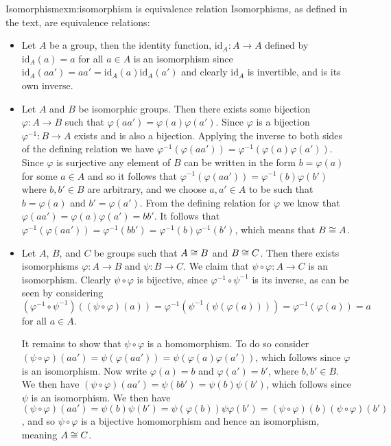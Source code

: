 \begin{exm}{Isomorphism}{exm:isomorphism is equivalence relation}
    Isomorphisms, as defined in the text, are equivalence relations:
    \begin{itemize}
        \item Let \(A\) be a group, then the identity function, \(\mathrm{id}_A\colon A \to A\) defined by \(\mathrm{id}_A(a) = a\) for all \(a \in A\) is an isomorphism since \(\mathrm{id}_A(aa') = aa' = \mathrm{id}_A(a)\mathrm{id}_A(a')\) and clearly \(\mathrm{id}_A\) is invertible, and is its own inverse.
        \item Let \(A\) and \(B\) be isomorphic groups.
        Then there exists some bijection \(\varphi \colon A \to B\) such that \(\varphi(aa') = \varphi(a)\varphi(a')\).
        Since \(\varphi\) is a bijection \(\varphi^{-1}\colon B \to A\) exists and is also a bijection.
        Applying the inverse to both sides of the defining relation we have \(\varphi^{-1}(\varphi(aa')) = \varphi^{-1}(\varphi(a)\varphi(a'))\).
        Since \(\varphi\) is surjective any element of \(B\) can be written in the form \(b = \varphi(a)\) for some \(a \in A\) and so it follows that \(\varphi^{-1}(\varphi(aa')) = \varphi^{-1}(b)\varphi(b')\) where \(b, b' \in B\) are arbitrary, and we choose \(a, a' \in A\) to be such that \(b = \varphi(a)\) and \(b' = \varphi(a')\).
        From the defining relation for \(\varphi\) we know that \(\varphi(aa') = \varphi(a)\varphi(a') = bb'\).
        It follows that \(\varphi^{-1}(\varphi(aa')) = \varphi^{-1}(bb') = \varphi^{-1}(b)\varphi^{-1}(b')\), which means that \(B \cong A\).
        \item Let \(A\), \(B\), and \(C\) be groups such that \(A \cong B\) and \(B \cong C\).
        Then there exists isomorphisms \(\varphi \colon A \to B\) and \(\psi\colon B \to C\).
        We claim that \(\psi\circ \varphi \colon A \to C\) is an isomorphism.
        Clearly \(\psi\circ \varphi\) is bijective, since \(\varphi^{-1}\circ \psi^{-1}\) is its inverse, as can be seen by considering \((\varphi^{-1}\circ \psi^{-1})((\psi\circ \varphi)(a)) = \varphi^{-1}(\psi^{-1}(\psi(\varphi(a)))) = \varphi^{-1}(\varphi(a)) = a\) for all \(a \in A\).
        
        It remains to show that \(\psi \circ \varphi\) is a homomorphism.
        To do so consider \((\psi \circ \varphi)(aa') = \psi(\varphi(aa')) = \psi(\varphi(a)\varphi(a'))\), which follows since \(\varphi\) is an isomorphism.
        Now write \(\varphi(a) = b\) and \(\varphi(a') = b'\), where \(b, b' \in B\).
        We then have \((\psi \circ \varphi)(aa') = \psi(bb') = \psi(b)\psi(b')\), which follows since \(\psi\) is an isomorphism.
        We then have \((\psi \circ \varphi)(aa') = \psi(b)\psi(b') = \psi(\varphi(b))\psi\varphi(b') = (\psi \circ \varphi)(b)(\psi \circ \varphi)(b')\), and so \(\psi\circ\varphi\) is a bijective homomorphism and hence an isomorphism, meaning \(A \cong C\).
    \end{itemize}
\end{exm}

